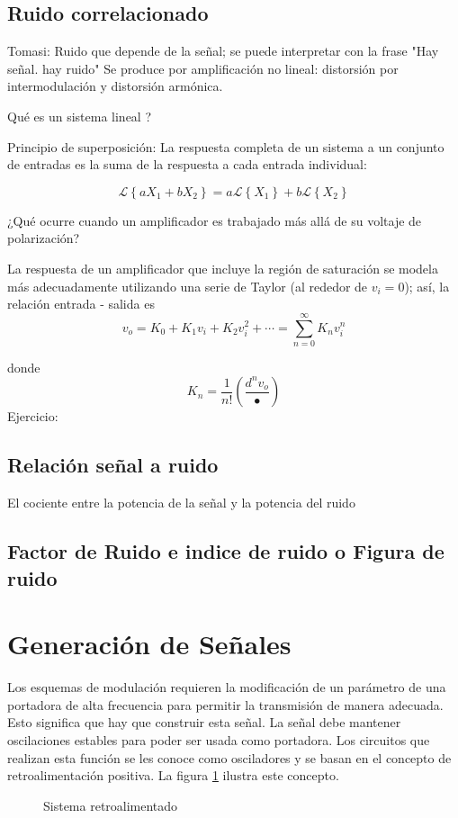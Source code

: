 \documentclass[12pt,letterpaper,titlepage,twoside]{book}
\begin{document}
\subsection{Ruido correlacionado}
Tomasi: Ruido que depende de la señal; se puede interpretar con la frase "Hay señal. hay ruido"
Se produce por amplificación no lineal: distorsión por intermodulación y distorsión armónica. 

Qué es un sistema lineal ?

Principio de superposición: 
La respuesta completa de un sistema a un conjunto de entradas es la suma de la respuesta a cada entrada individual:

\begin{equation}
\mathcal{L}\left\lbrace aX_1+bX_2\right\rbrace = a\mathcal{L}\left\lbrace X_1\right\rbrace +b\mathcal{L}\left\lbrace X_2\right\rbrace 
\end{equation}

¿Qué ocurre cuando un amplificador es trabajado más allá de su voltaje de polarización?

La respuesta de un amplificador que incluye la región de saturación se modela más adecuadamente utilizando una serie de Taylor (al rededor de $v_i = 0$); así, la relación entrada -  salida es
\begin{equation}
v_o = K_0+K_1 v_i+K_2 v_i^2+ \cdots = \sum_{n=0}^\infty K_n v_i^n
\end{equation}

donde 
\begin{equation}
K_n = \frac{1}{n!}\left( \frac{d^n v_o}{•} \right)
\end{equation}
Ejercicio: 


\subsection{Relación señal a ruido}
El cociente entre la potencia de la señal y la potencia del ruido
\subsection{Factor de Ruido e indice de ruido o Figura de ruido}

\section{Generación de Señales}

Los esquemas de modulación requieren la modificación de un parámetro de una portadora de alta frecuencia para permitir la transmisión de manera adecuada. Esto significa que hay que construir esta señal. La señal debe mantener oscilaciones estables para poder ser usada como portadora. Los circuitos que realizan esta función se les conoce como osciladores y se basan en el concepto de retroalimentación positiva. La figura \ref{fig:fb} ilustra este concepto.
\begin{figure}

\caption{Sistema retroalimentado} \label{fig:fb}
\end{figure}
\end{document}

